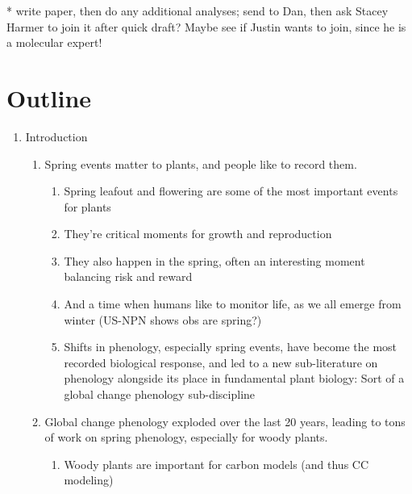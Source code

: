 \documentclass[11pt]{article}
\begin{document}
* write paper, then do any additional analyses; send to Dan, then ask Stacey Harmer to join it after quick draft? Maybe see if Justin wants to join, since he is a molecular expert!

\newpage
\section*{Outline}

\begin{enumerate}
\item Introduction %
\begin{enumerate}
\item Spring events matter to plants, and people like to record them.
\begin{enumerate}
\item Spring leafout and flowering are some of the most important events for plants 
\item They're critical moments for growth and reproduction 
\item They also happen in the spring, often an interesting moment balancing risk and reward
\item And a time when humans like to monitor life, as we all emerge from winter (US-NPN shows obs are spring?) %
\item Shifts in phenology, especially spring events, have become the most recorded biological response, and led to a new sub-literature on phenology alongside its place in fundamental plant biology: Sort of a global change phenology sub-discipline %
\end{enumerate}
\item Global change phenology  exploded over the last 20 years, leading to tons of work on spring phenology, especially for woody plants.
\begin{enumerate}
\item Woody plants are important for carbon models (and thus CC modeling)

\end{enumerate}
\end{enumerate}
\end{enumerate}
\end{document}
